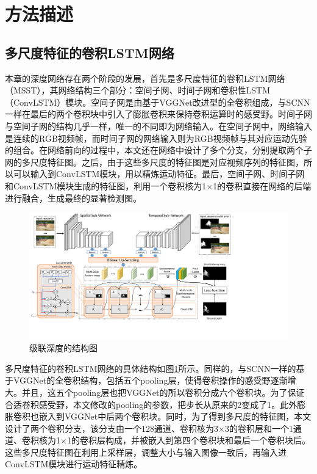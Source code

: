 \section{方法描述}
\subsection{多尺度特征的卷积LSTM网络}
本章的深度网络存在两个阶段的发展，首先是多尺度特征的卷积LSTM网络（MSST），其网络结构三个部分：空间子网、时间子网和卷积性LSTM（ConvLSTM）模块。空间子网是由基于VGGNet改进型的全卷积组成，与SCNN一样在最后的两个卷积块中引入了膨胀卷积来保持卷积运算时的感受野。时间子网与空间子网的结构几乎一样，唯一的不同即为网络输入。在空间子网中，网络输入是连续的RGB视频帧，而时间子网的网络输入则为RGB视频帧与其对应运动先验的组合。在网络前向的过程中，本文还在网络中设计了多个分支，分别提取两个子网的多尺度特征图。之后，由于这些多尺度的特征图是对应视频序列的特征图，所以可以输入到ConvLSTM模块，用以精炼运动特征。最后，空间子网、时间子网和ConvLSTM模块生成的特征图，利用一个卷积核为1$\times$1的卷积直接在网络的后端进行融合，生成最终的显著检测图。

\begin{figure}
\includegraphics[width=15cm]{figures/msst_framework}
\caption{级联深度的结构图}
\label{msst}
\end{figure}

多尺度特征的卷积LSTM网络的具体结构如图\ref{msst}所示。同样的，与SCNN一样的基于VGGNet的全卷积结构，包括五个pooling层，使得卷积操作的感受野逐渐增大。并且，这五个pooling层也把VGGNet的所以卷积分成六个卷积块。为了保证合适卷积感受野，本文修改的pooling的参数，把步长从原来的2变成了1。此外膨胀卷积也嵌入到VGGNet中后两个卷积块。同时，为了得到多尺度的特征图，本文设计了两个卷积分支，该分支由一个128通道、卷积核为3$\times$3的卷积层和一个1通道、卷积核为1$\times$1的卷积层构成，并被嵌入到第四个卷积块和最后一个卷积块后。这些多尺度特征图在利用上采样层，调整大小与输入图像一致后，再输入进ConvLSTM模块进行运动特征精炼。

